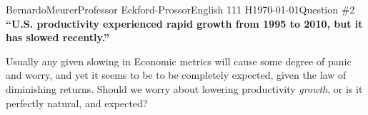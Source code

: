 \documentclass[12pt,letterpaper]{article}
\begin{document}
\begin{mla}{Bernardo}{Meurer}{Professor Eckford-Prossor}{English 111 H}{\today}{Question \#2}
    \noindent\textbf{``U.S. productivity experienced rapid growth from 1995 to 2010, but it has slowed recently.''}

    Usually any given slowing in Economic metrics will cause some degree of panic and worry, and yet it seems to be to be completely expected, given the law of diminishing returns. Should we worry about lowering productivity \emph{growth}, or is it perfectly natural, and expected?
\end{mla}
\end{document}
